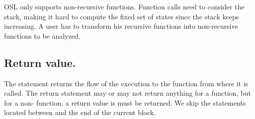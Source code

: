 \begin{figure}[H]
    \begin{subfigure}{\textwidth}
        \centering
        \begin{prooftree}
        \end{prooftree}
        \vspace{0.5cm}
    \end{subfigure}
    \begin{subfigure}{\textwidth}
        \centering
        \begin{prooftree}
        \end{prooftree}
        \vspace{0.5cm}
    \end{subfigure}
    \begin{subfigure}{\textwidth}   
        \centering
        \begin{prooftree}
        \end{prooftree}
    \end{subfigure}
\end{figure}

OSL only supports non-recursive functions. Function calls need to consider the stack, making it hard to compute the fixed set of states since the stack keeps increasing. A user has to transform his  
recursive functions into non-recursive functions to be analyzed.

\subsection{Return value.}
\label{ssec:val}

The  statement returns the flow of the execution to the function from where it is called. The return statement may or may not return anything for a  function, but for a non- function, a return value is must be returned. We skip the statements located between  and the end of the current block. 

